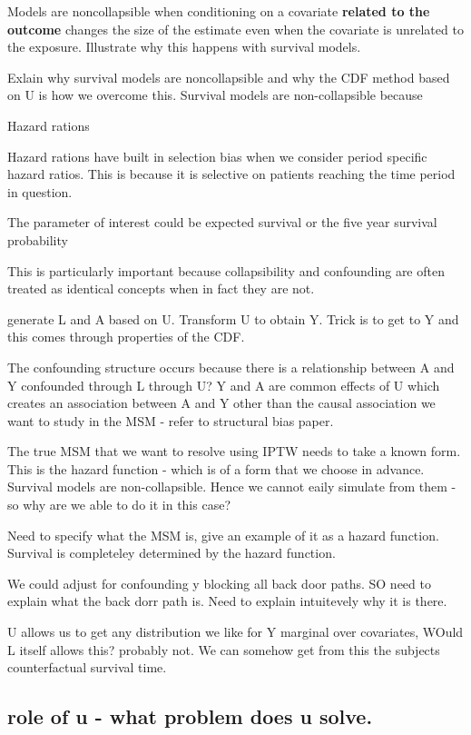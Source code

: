 \documentclass[11pt]{article}
\begin{document}
Models are noncollapsible when conditioning on a covariate
\textbf{related to the outcome} changes the size of the estimate even
when the covariate is unrelated to the exposure. Illustrate why this
happens with survival models.

Exlain why survival models are noncollapsible and why the CDF method
based on U is how we overcome this. Survival models are non-collapsible
because

Hazard rations

Hazard rations have built in selection bias when we consider period
specific hazard ratios. This is because it is selective on patients
reaching the time period in question.

The parameter of interest could be expected survival or the five year
survival probability

This is particularly important because collapsibility and confounding
are often treated as identical concepts when in fact they are not.
\citet{Greenland1999}

generate L and A based on U. Transform U to obtain Y. Trick is to get to
Y and this comes through properties of the CDF.

The confounding structure occurs because there is a relationship between
A and Y confounded through L through U? Y and A are common effects of U
which creates an association between A and Y other than the causal
association we want to study in the MSM - refer to structural bias
paper.

The true MSM that we want to resolve using IPTW needs to take a known
form. This is the hazard function - which is of a form that we choose in
advance. Survival models are non-collapsible. Hence we cannot eaily
simulate from them - so why are we able to do it in this case?

Need to specify what the MSM is, give an example of it as a hazard
function. Survival is completeley determined by the hazard function.

We could adjust for confounding y blocking all back door paths. SO need
to explain what the back dorr path is. Need to explain intuitevely why
it is there.

U allows us to get any distribution we like for Y marginal over
covariates, WOuld L itself allows this? probably not. We can somehow get
from this the subjects counterfactual survival time.

\subsection{role of u - what problem does u
solve.}\label{role-of-u---what-problem-does-u-solve.}
\end{document}
